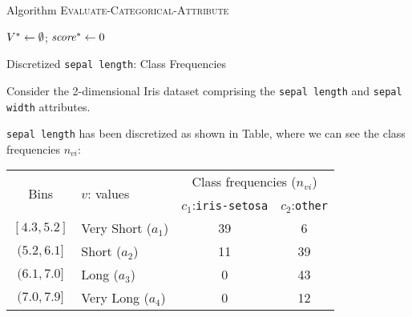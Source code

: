 \begin{frame}[fragile]{Algorithm \textsc{Evaluate-Categorical-Attribute}}
\begin{tightalgo}[H]{\textwidth-18pt}
  \small
    \Algorithm{}
    $V^* \leftarrow \emptyset$; $\mathit{score}^* \leftarrow 0$ 
\end{tightalgo}
\end{frame}



\begin{frame}{Discretized {\tt sepal length}: Class Frequencies}

Consider the 2-dimensional Iris dataset comprising the {\tt sepal
    length} and {\tt sepal width} attributes.

\medskip

{\tt sepal length} has been discretized as shown in {Table}, where we 
can see the class frequencies $n_{vi}$:

\begin{center}
\renewcommand{\arraystretch}{1.1}
\begin{tabular}{|c|l|c|c|}
                \hline
                \multirow{2}{*}{Bins} & \multirow{2}{*}{$v$: values }
                    & \multicolumn{2}{c|}{Class frequencies
                        ($n_{vi}$)}\\
                    \cline{3-4}
                & & $c_1$:{\tt iris-setosa} & $c_2$:{\tt other}\\
                \hline
                $[4.3, 5.2]$ & Very Short ($a_1$) & 39 & 6\\
                $(5.2, 6.1]$ & Short ($a_2$) & 11 & 39\\
                $(6.1, 7.0]$ & Long ($a_3$) & 0 & 43\\
                $(7.0, 7.9]$ & Very Long ($a_4$) & 0 & 12\\
                \hline
\end{tabular}%
\end{center}
\end{frame}

